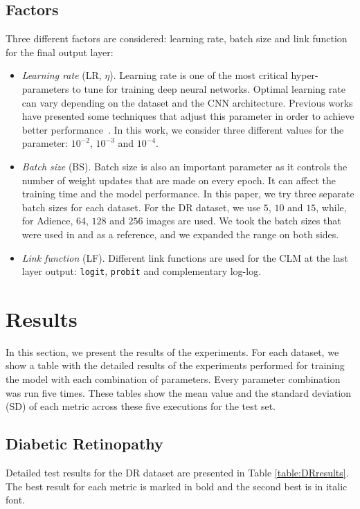 \documentclass[journal]{IEEEtran}
\begin{document}
	\subsection{Factors}
	Three different factors are considered: learning rate, batch size and link function for the final output layer:
	\begin{itemize}
		\item \textit{Learning rate} (LR, $\eta$). Learning rate is one of the most critical hyper-parameters to tune for training deep neural networks. Optimal learning rate can vary depending on the dataset and the CNN architecture. Previous works have presented some techniques that adjust this parameter in order to achieve better performance~\cite{smith2017cyclical,senior2013empirical}. In this work, we consider three different values for the parameter: $10^{-2}$, $10^{-3}$ and $10^{-4}$.
		\item \textit{Batch size} (BS). Batch size is also an important parameter as it controls the number of weight updates that are made on every epoch. It can affect the training time and the model performance. In this paper, we try three separate batch sizes for each dataset. For the DR dataset, we use $5$, $10$ and $15$, while, for Adience, $64$, $128$ and $256$ images are used. We took the batch sizes that were used in \cite{de2018weighted} and \cite{beckham2017unimodal} as a reference, and we expanded the range on both sides.
		\item \textit{Link function} (LF). Different link functions are used for the CLM at the last layer output: \texttt{logit}, \texttt{probit} and complementary log-log.
	\end{itemize}
	
	\section{Results}
	\label{sect:results}
	In this section, we present the results of the experiments. For each dataset, we show a table with the detailed results of the experiments performed for training the model with each combination of parameters. Every parameter combination was run five times. These tables show the mean value and the standard deviation (SD) of each metric across these five executions for the test set.
	
	\subsection{Diabetic Retinopathy}
	\label{sect:dr}
	Detailed test results for the DR dataset are presented in Table \ref{table:DRresults}. The best result for each metric is marked in bold and the second best is in italic font.
	
\end{document}

